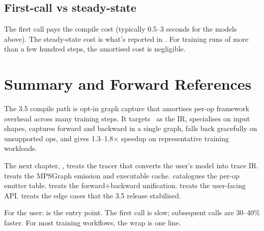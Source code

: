 \subsection{First-call vs steady-state}
\label{ssec:compile_design:first_call_cost}

The first call pays the compile cost (typically 0.5--3 seconds
for the models above). The steady-state cost is what's reported
in . For training runs of
more than a few hundred steps, the amortised cost is negligible.

\section{Summary and Forward References}
\label{sec:compile_design:summary}

The 3.5 compile path is opt-in graph capture that amortises
per-op framework overhead across many training steps. It targets
\MPSGraph\ as the IR, specialises on input shapes, captures
forward and backward in a single graph, falls back gracefully on
unsupported ops, and gives 1.3--1.8$\times$ speedup on
representative training workloads.

The next chapter, , treats the tracer that
converts the user's model into trace IR.
 treats the MPSGraph emission and
executable cache.  catalogues the per-op
emitter table.  treats the
forward+backward unification.  treats
the user-facing API.  treats the
edge cases that the 3.5 release stabilised.

\begin{lucidnote}
For the user:  is the entry point.
The first call is slow; subsequent calls are 30--40\% faster.
For most training workflows, the wrap is one line.
\end{lucidnote}
